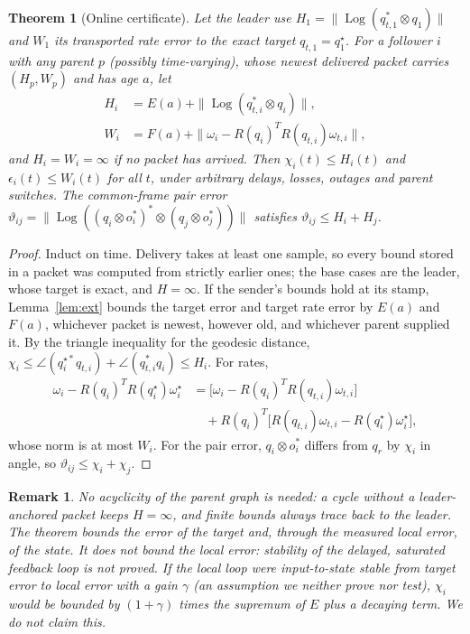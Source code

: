 \documentclass[journal]{IEEEtran}
\DeclareMathOperator{\Log}{Log}
\newtheorem{theorem}{Theorem}
\newtheorem{remark}{Remark}
\begin{document}
\begin{theorem}[Online certificate]\label{thm:cert}
Let the leader use $H_1=\|\Log(q_{t,1}^*\otimes q_1)\|$ and $W_1$ its transported rate error to the exact target $q_{t,1}=q_1^\star$. For a follower $i$ with any parent $p$ (possibly time-varying), whose newest delivered packet carries $(H_p,W_p)$ and has age $a$, let
\begin{align}
H_i&=E(a)+\|\Log(q_{t,i}^*\otimes q_i)\|,\\
W_i&=F(a)+\|\omega_i-R(q_i)^TR(q_{t,i})\omega_{t,i}\|,
\end{align}
and $H_i=W_i=\infty$ if no packet has arrived. Then $\chi_i(t)\le H_i(t)$ and $\epsilon_i(t)\le W_i(t)$ for all $t$, under arbitrary delays, losses, outages and parent switches. The common-frame pair error $\vartheta_{ij}=\|\Log((q_i\otimes o_i^*)^*\otimes(q_j\otimes o_j^*))\|$ satisfies $\vartheta_{ij}\le H_i+H_j$.
\end{theorem}
\begin{proof}
Induct on time. Delivery takes at least one sample, so every bound stored in a packet was computed from strictly earlier ones; the base cases are the leader, whose target is exact, and $H=\infty$. If the sender's bounds hold at its stamp, Lemma~\ref{lem:ext} bounds the target error and target rate error by $E(a)$ and $F(a)$, whichever packet is newest, however old, and whichever parent supplied it. By the triangle inequality for the geodesic distance, $\chi_i\le\angle(q_i^{\star*}q_{t,i})+\angle(q_{t,i}^*q_i)\le H_i$. For rates,
\begin{equation}
\begin{aligned}\omega_i-R(q_i)^TR(q_i^\star)\omega_i^\star&=\big[\omega_i-R(q_i)^TR(q_{t,i})\omega_{t,i}\big]\\&\quad+R(q_i)^T\big[R(q_{t,i})\omega_{t,i}-R(q_i^\star)\omega_i^\star\big],\end{aligned}
\end{equation}
whose norm is at most $W_i$. For the pair error, $q_i\otimes o_i^*$ differs from $q_r$ by $\chi_i$ in angle, so $\vartheta_{ij}\le\chi_i+\chi_j$.
\end{proof}

\begin{remark}
No acyclicity of the parent graph is needed: a cycle without a leader-anchored packet keeps $H=\infty$, and finite bounds always trace back to the leader. The theorem bounds the error of the \emph{target} and, through the measured local error, of the state. It does not bound the local error: stability of the delayed, saturated feedback loop is not proved. If the local loop were input-to-state stable from target error to local error with a gain $\gamma$ (an assumption we neither prove nor test), $\chi_i$ would be bounded by $(1+\gamma)$ times the supremum of $E$ plus a decaying term. We do not claim this.
\end{remark}
\end{document}
